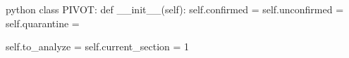 \begin{mintedbox}[samepage]{python}
class PIVOT:
    def __init__(self):
        self.confirmed = {}
        self.unconfirmed = {}
        self.quarantine = {}

        self.to_analyze = {}
        self.current_section = 1
\end{mintedbox}